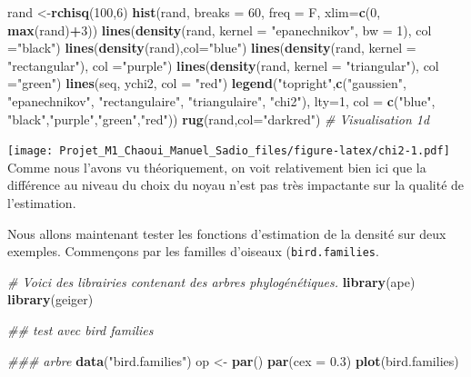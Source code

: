 \documentclass[
]{book}
\newenvironment{Shaded}{\begin{snugshade}}{\end{snugshade}}
\newcommand{\CommentTok}[1]{\textcolor[rgb]{0.56,0.35,0.01}{\textit{#1}}}
\newcommand{\DataTypeTok}[1]{\textcolor[rgb]{0.13,0.29,0.53}{#1}}
\newcommand{\DecValTok}[1]{\textcolor[rgb]{0.00,0.00,0.81}{#1}}
\newcommand{\FloatTok}[1]{\textcolor[rgb]{0.00,0.00,0.81}{#1}}
\newcommand{\KeywordTok}[1]{\textcolor[rgb]{0.13,0.29,0.53}{\textbf{#1}}}
\newcommand{\NormalTok}[1]{#1}
\newcommand{\OperatorTok}[1]{\textcolor[rgb]{0.81,0.36,0.00}{\textbf{#1}}}
\newcommand{\StringTok}[1]{\textcolor[rgb]{0.31,0.60,0.02}{#1}}
\begin{document}
\begin{Shaded}
\begin{Highlighting}[]
\NormalTok{rand <-}\KeywordTok{rchisq}\NormalTok{(}\DecValTok{100}\NormalTok{,}\DecValTok{6}\NormalTok{)}
\KeywordTok{hist}\NormalTok{(rand, }\DataTypeTok{breaks =} \DecValTok{60}\NormalTok{, }\DataTypeTok{freq =}\NormalTok{ F, }\DataTypeTok{xlim=}\KeywordTok{c}\NormalTok{(}\DecValTok{0}\NormalTok{, }\KeywordTok{max}\NormalTok{(rand)}\OperatorTok{+}\DecValTok{3}\NormalTok{))}
\KeywordTok{lines}\NormalTok{(}\KeywordTok{density}\NormalTok{(rand, }\DataTypeTok{kernel =}  \StringTok{"epanechnikov"}\NormalTok{, }\DataTypeTok{bw =} \DecValTok{1}\NormalTok{), }\DataTypeTok{col =}\StringTok{"black"}\NormalTok{)}
\KeywordTok{lines}\NormalTok{(}\KeywordTok{density}\NormalTok{(rand),}\DataTypeTok{col=}\StringTok{"blue"}\NormalTok{)}
\KeywordTok{lines}\NormalTok{(}\KeywordTok{density}\NormalTok{(rand, }\DataTypeTok{kernel =}  \StringTok{"rectangular"}\NormalTok{), }\DataTypeTok{col =}\StringTok{"purple"}\NormalTok{)}
\KeywordTok{lines}\NormalTok{(}\KeywordTok{density}\NormalTok{(rand, }\DataTypeTok{kernel =}  \StringTok{"triangular"}\NormalTok{), }\DataTypeTok{col =}\StringTok{"green"}\NormalTok{)}
\KeywordTok{lines}\NormalTok{(seq, ychi2, }\DataTypeTok{col =} \StringTok{"red"}\NormalTok{)}
\KeywordTok{legend}\NormalTok{(}\StringTok{"topright"}\NormalTok{,}\KeywordTok{c}\NormalTok{(}\StringTok{"gaussien"}\NormalTok{, }\StringTok{"epanechnikov"}\NormalTok{, }\StringTok{"rectangulaire"}\NormalTok{, }\StringTok{"triangulaire"}\NormalTok{, }\StringTok{"chi2"}\NormalTok{),}
       \DataTypeTok{lty=}\DecValTok{1}\NormalTok{, }\DataTypeTok{col =} \KeywordTok{c}\NormalTok{(}\StringTok{"blue"}\NormalTok{, }\StringTok{"black"}\NormalTok{,}\StringTok{"purple"}\NormalTok{,}\StringTok{"green"}\NormalTok{,}\StringTok{"red"}\NormalTok{))}
\KeywordTok{rug}\NormalTok{(rand,}\DataTypeTok{col=}\StringTok{"darkred"}\NormalTok{) }\CommentTok{# Visualisation 1d}
\end{Highlighting}
\end{Shaded}

\texttt{[image: Projet\_M1\_Chaoui\_Manuel\_Sadio\_files/figure-latex/chi2-1.pdf]}
Comme nous l'avons vu théoriquement, on voit relativement bien ici que la différence au niveau du choix du noyau n'est pas très impactante sur la qualité de l'estimation.

Nous allons maintenant tester les fonctions d'estimation de la densité sur deux exemples.
Commençons par les familles d'oiseaux (\texttt{bird.families}.

\begin{Shaded}
\begin{Highlighting}[]
\CommentTok{# Voici des librairies contenant des arbres phylogénétiques.}
\KeywordTok{library}\NormalTok{(ape)}
\KeywordTok{library}\NormalTok{(geiger)}

\CommentTok{## test avec bird families}

\CommentTok{### arbre}
\KeywordTok{data}\NormalTok{(}\StringTok{"bird.families"}\NormalTok{)}
\NormalTok{op <-}\StringTok{ }\KeywordTok{par}\NormalTok{()}
\KeywordTok{par}\NormalTok{(}\DataTypeTok{cex =} \FloatTok{0.3}\NormalTok{)}
\KeywordTok{plot}\NormalTok{(bird.families)}
\end{Highlighting}
\end{Shaded}
\end{document}
